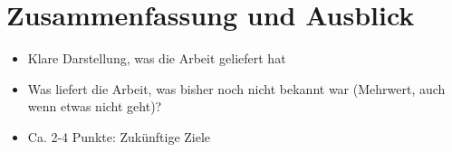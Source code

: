 \chapter{Zusammenfassung und Ausblick}

\begin{itemize}
	\item Klare Darstellung, was die Arbeit geliefert hat
	\item Was liefert die Arbeit, was bisher noch nicht bekannt war (Mehrwert, auch wenn etwas nicht geht)?
	\item Ca. 2-4 Punkte: Zukünftige Ziele 
\end{itemize}
